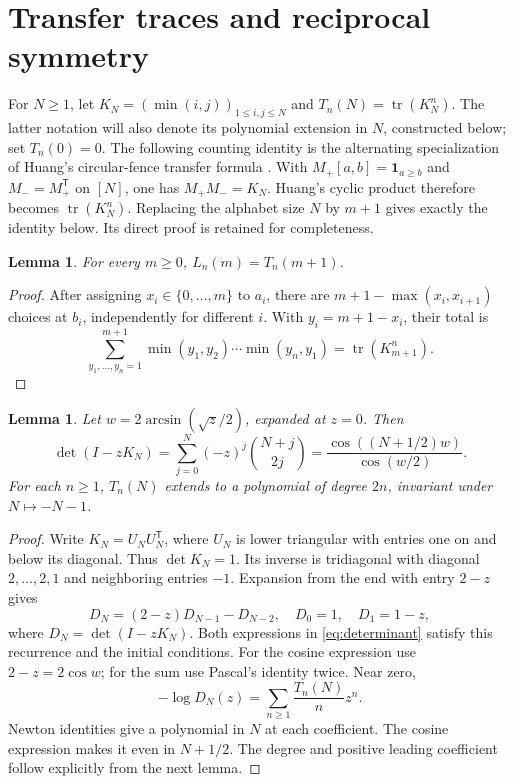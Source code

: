 \documentclass[11pt,letterpaper]{article}
\numberwithin{equation}{section}
\newtheorem{lemma}[theorem]{Lemma}
\newcommand{\tr}{\operatorname{tr}}
\begin{document}
\section{Transfer traces and reciprocal symmetry}\label{sec:transfer}
For $N\ge1$, let $K_N=(\min(i,j))_{1\le i,j\le N}$ and $T_n(N)=\tr(K_N^n)$. The latter notation will also denote its polynomial extension in $N$, constructed below; set $T_n(0)=0$.
The following counting identity is the alternating specialization of Huang's circular-fence transfer formula \cite[Proposition~4.1]{Huang}. With $M_+[a,b]=\mathbf1_{a\ge b}$ and $M_-=M_+^{\mathsf T}$ on $[N]$, one has $M_+M_-=K_N$. Huang's cyclic product therefore becomes $\tr(K_N^n)$. Replacing the alphabet size $N$ by $m+1$ gives exactly the identity below. Its direct proof is retained for completeness.
\begin{lemma}\label{lem:transfer}
For every $m\ge0$, $L_n(m)=T_n(m+1)$.
\end{lemma}
\begin{proof}
After assigning $x_i\in\{0,\ldots,m\}$ to $a_i$, there are $m+1-\max(x_i,x_{i+1})$ choices at $b_i$, independently for different $i$. With $y_i=m+1-x_i$, their total is
\[
 \sum_{y_1,\ldots,y_n=1}^{m+1}
 \min(y_1,y_2)\cdots\min(y_n,y_1)=\tr(K_{m+1}^n).
\]
\end{proof}
\begin{lemma}\label{lem:determinant}
Let $w=2\arcsin(\sqrt z/2)$, expanded at $z=0$. Then
\begin{equation}\label{eq:determinant}
 \det(I-zK_N)=\sum_{j=0}^N(-z)^j\binom{N+j}{2j}
 =\frac{\cos((N+1/2)w)}{\cos(w/2)}.
\end{equation}
For each $n\ge1$, $T_n(N)$ extends to a polynomial of degree $2n$, invariant under $N\mapsto-N-1$.
\end{lemma}
\begin{proof}
Write $K_N=U_NU_N^{\mathsf T}$, where $U_N$ is lower triangular with entries one on and below its diagonal. Thus $\det K_N=1$. Its inverse is tridiagonal with diagonal $2,\ldots,2,1$ and neighboring entries $-1$. Expansion from the end with entry $2-z$ gives
\[
 D_N=(2-z)D_{N-1}-D_{N-2},\quad D_0=1,\quad D_1=1-z,
\]
where $D_N=\det(I-zK_N)$. Both expressions in \eqref{eq:determinant} satisfy this recurrence and the initial conditions. For the cosine expression use $2-z=2\cos w$; for the sum use Pascal's identity twice. Near zero,
\begin{equation}\label{eq:trace-log}
 -\log D_N(z)=\sum_{n\ge1}\frac{T_n(N)}n z^n.
\end{equation}
Newton identities give a polynomial in $N$ at each coefficient. The cosine expression makes it even in $N+1/2$. The degree and positive leading coefficient follow explicitly from the next lemma.
\end{proof}
\end{document}

